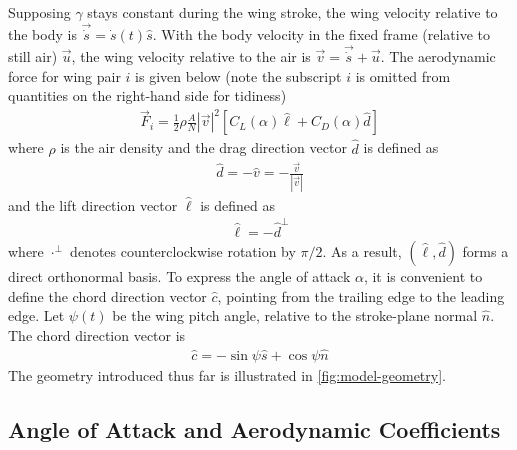 \documentclass[11pt,letterpaper]{article}
\begin{document}
Supposing $\gamma$ stays constant during the wing
stroke, the wing velocity relative to the body is
$\vec{\dot{s}} = \dot{s}(t) \hat{s}$.
With the body velocity in the fixed frame (relative to still air) $\vec{u}$,
the wing velocity relative to the air is $\vec{v} = \vec{\dot{s}} + \vec{u}$.
The aerodynamic force for wing pair $i$ is given below (note the
subscript $i$ is omitted from quantities on the right-hand side for tidiness)
\begin{align}
    \vec{F}_i = \frac12 \rho \frac{A}{N} |\vec{v}|^2 \left[ C_L(\alpha) \hat{\ell} + C_D(\alpha) \hat{d} \right] \label{eq:faero}
\end{align}
where $\rho$ is the air density and the drag direction vector $\hat{d}$
is defined as
\begin{align}
    \hat{d} = -\hat{v} = -\frac{\vec{v}}{|\vec{v}|}
\end{align}
and the lift direction vector $\hat{\ell}$ is defined as
\begin{align}
    \hat{\ell} = -\hat{d}^\perp
\end{align}
where $\cdot^\perp$ denotes counterclockwise rotation by $\pi/2$.
As a result, $(\hat{\ell},\hat{d})$ forms a direct orthonormal basis.
To express the angle of attack $\alpha$, it is convenient to
define the chord direction vector $\hat{c}$, pointing from the
trailing edge to the leading edge. Let $\psi(t)$ be the wing pitch angle,
relative to the stroke-plane normal $\hat{n}$. The chord direction vector is
\begin{align}
    \hat{c} = - \sin\psi\hat{s} + \cos\psi\hat{n}
\end{align}
The geometry introduced thus far is illustrated in \autoref{fig:model-geometry}.

\subsection{Angle of Attack and Aerodynamic Coefficients}\label{sec:aoa}
\end{document}
